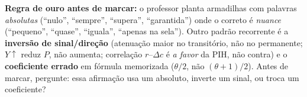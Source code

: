 \documentclass[10pt, a4paper]{article}
\begin{document}
\vspace{0.5em}
\begin{tcolorbox}[standard, colback=white, colframe=azul, boxrule=1.2pt,
  arc=3pt, left=8pt, right=8pt, top=5pt, bottom=5pt]
\textbf{\color{azul} Regra de ouro antes de marcar:} o professor planta
armadilhas com palavras \emph{absolutas} (``nulo'', ``sempre'', ``supera'',
``garantida'') onde o correto é \emph{nuance} (``pequeno'', ``quase'',
``iguala'', ``apenas na sela''). Outro padrão recorrente é a
\textbf{inversão de sinal/direção} (atenuação maior no transitório, não no
permanente; $Y\uparrow$ reduz $P$, não aumenta; correlação $r$--$\Delta c$ é
\emph{a favor} da PIH, não contra) e o \textbf{coeficiente errado} em
fórmula memorizada ($\theta/2$, não $(\theta+1)/2$). Antes de marcar,
pergunte: essa afirmação usa um absoluto, inverte um sinal, ou troca um
coeficiente?
\end{tcolorbox}
\end{document}
